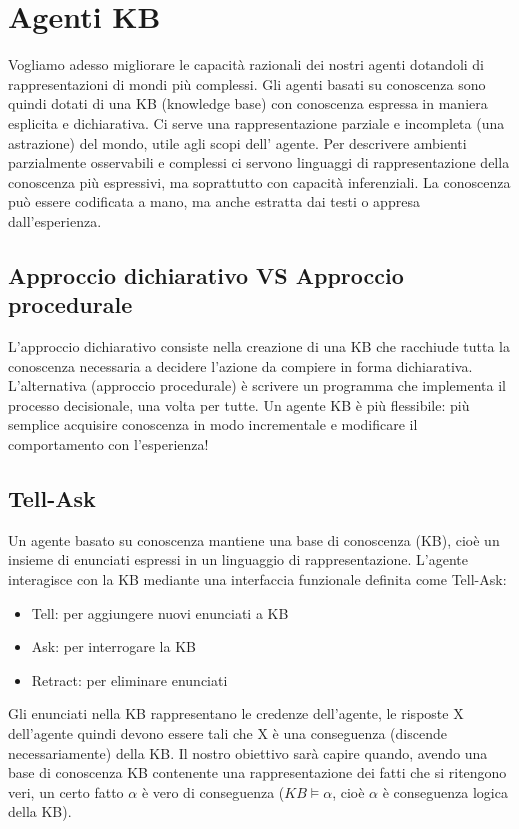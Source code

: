 \documentclass{article}
\begin{document}
\section{Agenti KB}
Vogliamo adesso migliorare le capacità razionali dei nostri agenti dotandoli di rappresentazioni di mondi più complessi. Gli agenti basati su conoscenza sono quindi dotati di una KB (knowledge base) con conoscenza espressa in maniera esplicita e dichiarativa. Ci serve una rappresentazione parziale e incompleta (una astrazione) del mondo, utile agli scopi dell' agente. Per descrivere ambienti parzialmente osservabili e complessi ci servono linguaggi di rappresentazione della conoscenza più espressivi, ma soprattutto con capacità inferenziali. La conoscenza può essere codificata a mano, ma anche estratta dai testi o appresa dall’esperienza.

\subsection{Approccio dichiarativo VS Approccio procedurale}
L'approccio dichiarativo consiste nella creazione di una KB che racchiude tutta la conoscenza necessaria a decidere l’azione da compiere in forma dichiarativa. L’alternativa (approccio procedurale) è scrivere un programma che implementa il processo decisionale, una volta per tutte. \newline
Un agente KB è più flessibile: più semplice acquisire conoscenza in modo incrementale e modificare il comportamento con l’esperienza!

\subsection{Tell-Ask} 
Un agente basato su conoscenza mantiene una base di conoscenza (KB), cioè un insieme di enunciati espressi in un linguaggio di rappresentazione. L'agente interagisce con la KB mediante una interfaccia funzionale definita come Tell-Ask:
\begin{itemize}
    \item Tell: per aggiungere nuovi enunciati a KB
    \item Ask: per interrogare la KB
    \item Retract: per eliminare enunciati
\end{itemize}
Gli enunciati nella KB rappresentano le credenze dell'agente, le risposte X dell'agente quindi devono essere tali che X è una conseguenza (discende necessariamente) della KB. Il nostro obiettivo sarà capire quando, avendo una base di conoscenza KB contenente una rappresentazione dei fatti che si ritengono veri, un certo fatto $\alpha$ è vero di conseguenza ($KB \models \alpha$, cioè $\alpha$ è conseguenza logica della KB).
\end{document}
